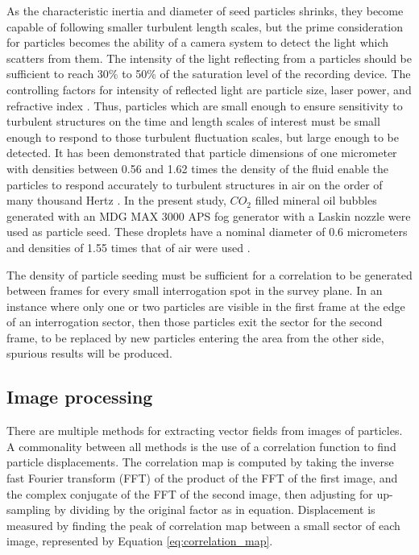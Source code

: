 As the characteristic inertia and diameter of seed particles shrinks, they 
become capable of following 
smaller turbulent length scales, but the prime consideration for particles 
becomes the ability of a camera system to detect the light which scatters from 
them. The intensity of the light reflecting from a 
particles should be sufficient to reach 30\% to 50\% of the saturation level of 
the recording device. The controlling factors for intensity of reflected light 
are particle size, laser power, and refractive index \cite{adrian2011}. Thus, 
particles which are small enough to ensure sensitivity to turbulent structures 
on the time and length scales of interest must be small enough to respond to 
those turbulent fluctuation scales, but large enough to be detected. It has 
been demonstrated that particle dimensions of one micrometer with densities 
between 0.56 and 1.62 times the density of the fluid enable the particles to 
respond accurately to turbulent structures in air on the order of many thousand 
Hertz \cite{mei1996}. In the 
present study, $CO_2$ filled mineral oil bubbles generated with an MDG MAX 3000 
APS fog generator with a Laskin 
nozzle were used as particle seed. These droplets have a nominal 
diameter of 0.6 micrometers and densities of 1.55 times that of air were used 
\cite{mdgfog}.

The density of particle seeding must be sufficient for a correlation to be 
generated between frames for every small interrogation spot in the survey 
plane. In an instance where only one or two particles are visible in the first 
frame at the edge of an interrogation sector, then those particles exit the 
sector for the second frame, to be replaced by new particles 
entering the area from the other side, spurious results will be produced.


\subsection{Image processing}

There are multiple methods for extracting vector fields from images of 
particles. A commonality between all methods is the use of a correlation 
function to find particle displacements. The correlation map is computed by 
taking the inverse fast Fourier transform (FFT) of the product of the FFT of 
the first image, and the complex conjugate of the FFT of the second image, then 
adjusting for up-sampling by dividing by the original factor as in equation. 
Displacement is measured by finding the peak of correlation map between a small 
sector of each image, represented by Equation \ref{eq:correlation_map}. 

